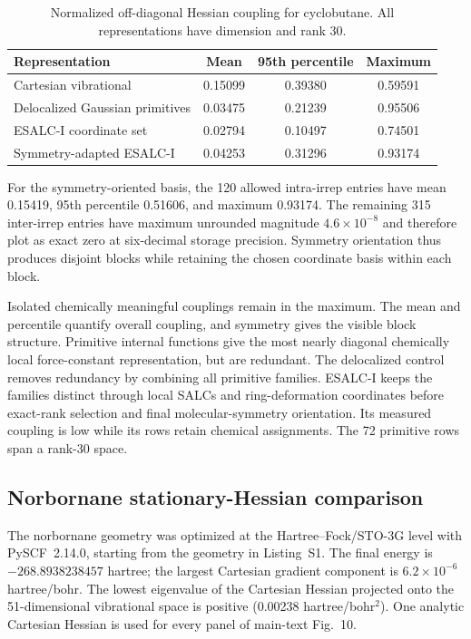 \documentclass[10pt]{article}
\begin{document}
{\begin{table}[htbp]
\centering
\caption{Normalized off-diagonal Hessian coupling for cyclobutane.  All
representations have dimension and rank 30.}
\label{tab:hessian-locality}
\begin{tabular}{lccc}
\toprule
Representation & Mean & 95th percentile & Maximum \\
\midrule
Cartesian vibrational & 0.15099 & 0.39380 & 0.59591 \\
{Delocalized Gaussian primitives} & {0.03475} & {0.21239} & {0.95506} \\
ESALC-I coordinate set & 0.02794 & 0.10497 & 0.74501 \\
Symmetry-adapted ESALC-I & 0.04253 & 0.31296 & 0.93174 \\
\bottomrule
\end{tabular}
\end{table}

For the symmetry-oriented basis, the 120 allowed intra-irrep entries have
mean 0.15419, 95th percentile 0.51606, and maximum 0.93174.  The remaining 315
inter-irrep entries have maximum unrounded magnitude
\(4.6\times10^{-8}\) and therefore plot as exact zero at six-decimal storage
precision.  Symmetry orientation thus produces disjoint blocks while retaining the
chosen coordinate basis within each block.

Isolated chemically meaningful couplings remain in the maximum. The mean and
percentile quantify overall coupling, and symmetry gives the visible block
structure.
{Primitive internal functions give the most nearly diagonal
chemically local force-constant representation, but are redundant.  The
delocalized control removes redundancy by combining all primitive families.
ESALC-I keeps the families distinct through local SALCs and ring-deformation
coordinates before exact-rank selection and final molecular-symmetry
orientation.  Its measured coupling is low while its rows retain chemical
assignments.  The 72 primitive rows span a rank-30 space.}

\subsection{Norbornane stationary-Hessian comparison}

{The norbornane geometry was optimized at the
Hartree--Fock/STO-3G level with PySCF~2.14.0, starting from the geometry in
Listing~S1.  The final energy is \(-268.8938238457\) hartree; the largest
Cartesian gradient component is \(6.2\times10^{-6}\) hartree/bohr.  The
lowest eigenvalue of the Cartesian Hessian projected onto the 51-dimensional
vibrational space is positive (0.00238 hartree/bohr\(^2\)).  One analytic
Cartesian Hessian is used for every panel of main-text Fig.~10.}

}
\end{document}
